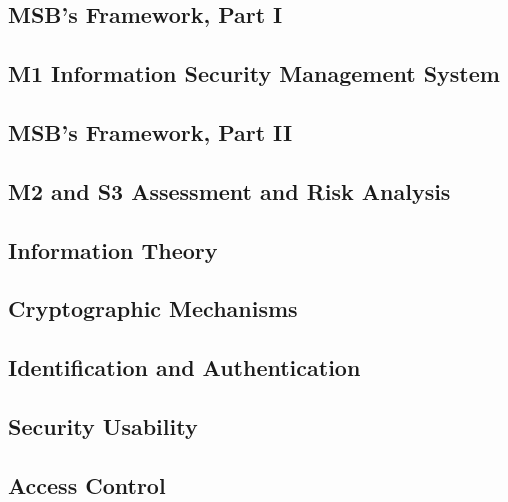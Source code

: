 \documentclass[a4paper]{llncs}
\begin{document}
\subsection{MSB's Framework, Part I}


\subsection{M1 Information Security Management System}


\subsection{MSB's Framework, Part II}


\subsection{M2 and S3 Assessment and Risk Analysis}


\subsection{Information Theory}


\subsection{Cryptographic Mechanisms}


\subsection{Identification and Authentication}


\subsection{Security Usability}


\subsection{Access Control}


%
\end{document}
